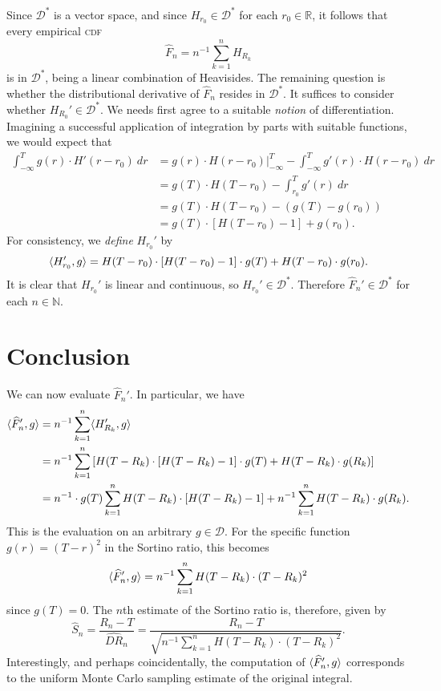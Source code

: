 \documentclass[12pt]{article}
\newcommand{\RR}{\mathbb{R}}
\newcommand{\NN}{\mathbb{N}}
\newcommand{\DD}{\mathcal{D}}
\newcommand{\inv}{{}^{-1}}
\renewcommand{\hat}{\widehat}
\DeclarePairedDelimiter{\ip}{\langle}{\rangle}
\begin{document}
Since $\DD^*$ is a vector space, and since $H_{r_0} \in \DD^*$ for each $r_0 \in
\RR$, it follows that every empirical \textsc{cdf}
\begin{equation*}
  \hat{F}_n = n\inv \sum_{k=1}^{n} H_{R_k}
\end{equation*}
is in $\DD^*$, being a linear combination of Heavisides. The
remaining question is whether the distributional derivative of $\hat{F}_n$
resides in $\DD^*$. It suffices to consider whether $H_{R_0}' \in \DD^*$. We
needs first agree to a suitable \emph{notion} of differentiation. Imagining a
successful application of integration by parts with suitable functions, we would
expect that
\begin{align*}
  \int_{-\infty}^T g(r) \cdot H'(r-r_0) \ dr 
  &= g(r) \cdot H(r-r_0)
  \bigg|_{-\infty}^{T} - \int_{-\infty}^{T} g'(r) \cdot H(r-r_0) \ dr \\
  &= g(T) \cdot H(T-r_0) - \int_{r_0}^T g'(r) \ dr \\
  &= g(T) \cdot H(T-r_0) - (g(T) - g(r_0)) \\
  &= g(T) \cdot [H(T-r_0) - 1] + g(r_0).
\end{align*}
For consistency, we \emph{define} $H_{r_0}'$ by
\begin{equation*}
  \ip{H_{r_0}', g} =  H(T-r_0)\cdot [H(T-r_0) - 1]\cdot g(T)  + H(T-r_0) \cdot
  g(r_0).
\end{equation*}
It is clear that $H_{r_0}'$ is linear and continuous, so $H_{r_0}' \in \DD^*$.
Therefore $\hat{F}_n' \in \DD^*$ for each $n \in \NN$.

\section{Conclusion}

We can now evaluate $\hat{F}_{n}'$. In particular, we have
\begin{align*}
  \ip{\hat{F}_n', g} &= n\inv \sum_{k=1}^{n} \ip{H_{R_k}', g} \\
  &= n\inv \sum_{k=1}^{n} \left[ 
    H(T-R_k)\cdot [H(T-R_k) - 1]\cdot g(T)  + H(T-R_k) \cdot
    g(R_k)
  \right] \\
  &= n\inv \cdot g(T) \sum_{k=1}^{n} H(T-R_k) \cdot \left[ 
    H(T-R_k) - 1 
  \right] 
  + n\inv \sum_{k=1}^{n} H(T-R_k) \cdot g(R_k).
\end{align*}
This is the evaluation on an arbitrary $g \in \DD$. For the specific function
$g(r) = (T-r)^2$ in the Sortino ratio, this becomes
\begin{equation*}
  \ip{\hat{F}_n', g} = n\inv \sum_{k=1}^{n} H(T-R_k) \cdot (T-R_k)^2
\end{equation*}
since $g(T) = 0$.  The $n$th estimate of the Sortino ratio is, therefore, given
by
\begin{equation*}
  \widehat{S}_n = \frac{R_n - T}{\hat{\textit{DR}}_n} = 
  \frac{R_n - T}{\sqrt{n\inv \sum_{k=1}^{n} H(T-R_k) \cdot (T-R_k)^2}}.
\end{equation*}
Interestingly, and perhaps coincidentally, the computation of $\ip{\hat{F}_n',
g}$ corresponds to the uniform Monte Carlo sampling estimate of the original
integral.
\end{document}
